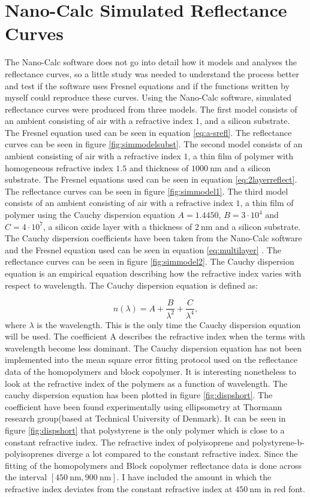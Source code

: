 \documentclass[MasterThesisMain.tex]{subfiles}
\begin{document}
\section{Nano-Calc Simulated Reflectance Curves}
The Nano-Calc software does not go into detail how it models and analyses the reflectance curves, so a little study was needed to understand the process better and test if the software uses Fresnel equations and if the functions written by myself could reproduce these curves. Using the Nano-Calc software, simulated reflectance curves were produced from three models. The first model consists of an ambient consisting of air with a refractive index $1$, and a silicon substrate. The Fresnel equation used can be seen in equation \ref{eq:a-srefl}. The reflectance curves can be seen in figure \ref{fig:simmodelsubst}. The second model consists of an ambient consisting of air with a refractive index $1$, a thin film of polymer with homogeneous refractive index $1.5$ and thickness of $\SI{1000}{\nano\meter}$ and a silicon substrate. The Fresnel equations used can be seen in equation \ref{eq:2layerreflect}. The reflectance curves can be seen in figure \ref{fig:simmodel1}. The third model consists of an ambient consisting of air with a refractive index $1$, a thin film of polymer using the Cauchy dispersion equation $A=1.4450$, $B=3 \cdot 10^4$ and $C=4 \cdot 10^7$, a silicon oxide layer with a thickness of $\SI{2}{\nano\meter}$ and a silicon substrate. The Cauchy dispersion coefficients have been taken from the Nano-Calc software and the Fresnel equation used can be seen in equation \ref{eq:multilayer} . The reflectance curves can be seen in figure \ref{fig:simmodel2}. The Cauchy dispersion equation is an empirical equation describing how the refractive index varies with respect to wavelength. The Cauchy dispersion equation is defined as:

\begin{equation}
n(\lambda) = A + \frac{B}{\lambda^2} + \frac{C}{\lambda^4},
\end{equation}
where $\lambda$ is the wavelength. This is the only time the Cauchy dispersion equation will be used. The coefficient A describes the refractive index when the terms with wavelength become less dominant. The Cauchy dispersion equation has not been implemented into the mean square error fitting protocol used on the reflectance data of the homopolymers and block copolymer. It is interesting nonetheless to look at the refractive index of the polymers as a function of wavelength. The cauchy dispersion equation has been plotted in figure \ref{fig:dispshort}. The coefficient have been found experimentally using ellipsometry at Thormann research group(based at Technical University of Denmark). It can be seen in figure \ref{fig:dispshort} that polystyrene is the only polymer which is close to a constant refractive index. The refractive index of polyisoprene and polystyrene-b-polyisoprenes diverge a lot compared to the constant refractive index. Since the fitting of the homopolymers and Block copolymer reflectance data is done across the interval $[\SI{450}{\nano\meter},\SI{900}{\nano\meter}]$. I have included the amount in which the refractive index deviates from the constant refractive index at $\SI{450}{\nano\meter}$ in red font.   
\end{document}
